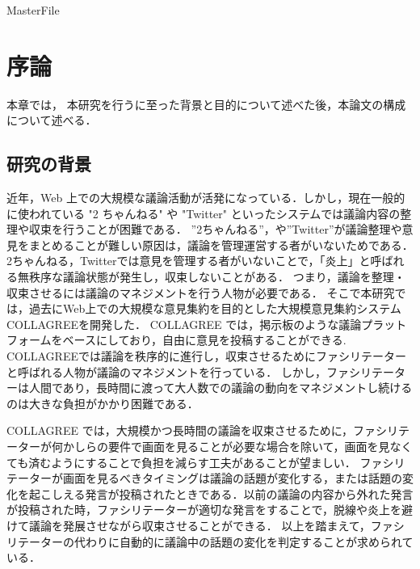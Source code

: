 \expandafter\ifx\csname MasterFile\endcsname\relax
	\def\SubFile{hoge}
	
	
	\setcounter{chapter}{0}
	\fi
\cleardoublepage
\chapter{序論}
\label{intro:chapter}
本章では， 本研究を行うに至った背景と目的について述べた後，本論文の構成について述べる．
\section{研究の背景}
\label{intro:background}
近年，Web 上での大規模な議論活動が活発になっている．しかし，現在一般的に使われている "2 ちゃんねる" や "Twitter" といったシステムでは議論内容の整理や収束を行うことが困難である．
”2ちゃんねる”，や”Twitter”が議論整理や意見をまとめることが難しい原因は，議論を管理運営する者がいないためである． 2ちゃんねる，Twitterでは意見を管理する者がいないことで，「炎上」と呼ばれる無秩序な議論状態が発生し，収束しないことがある．
つまり，議論を整理・収束させるには議論のマネジメントを行う人物が必要である．
そこで本研究では，過去にWeb上での大規模な意見集約を目的とした大規模意見集約システムCOLLAGREE\cite{collagreeTest}を開発した．
COLLAGREE では，掲示板のような議論プラットフォームをベースにしており，自由に意見を投稿することができる.
COLLAGREEでは議論を秩序的に進行し，収束させるためにファシリテーターと呼ばれる人物が議論のマネジメントを行っている．
しかし，ファシリテーターは人間であり，長時間に渡って大人数での議論の動向をマネジメントし続けるのは大きな負担がかかり困難である．

COLLAGREE では，大規模かつ長時間の議論を収束させるために，ファシリテーターが何かしらの要件で画面を見ることが必要な場合を除いて，画面を見なくても済むようにすることで負担を減らす工夫があることが望ましい．
ファシリテーターが画面を見るべきタイミングは議論の話題が変化する，または話題の変化を起こしえる発言が投稿されたときである．以前の議論の内容から外れた発言が投稿された時，ファシリテーターが適切な発言をすることで，脱線や炎上を避けて議論を発展させながら収束させることができる．
以上を踏まえて，ファシリテーターの代わりに自動的に議論中の話題の変化を判定することが求められている．

